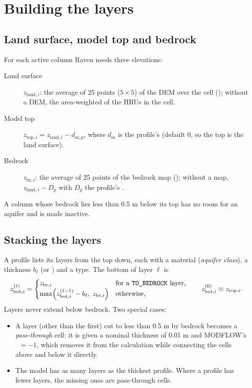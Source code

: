 \section{Building the layers}\label{ch:layers}
\subsection{Land surface, model top and bedrock}
For each active column Raven needs three elevations:
\begin{description}
\item[Land surface] $z_{\mathrm{land},i}$: the average of 25 points ($5\times5$) of the DEM over the cell
(); without a DEM, the area-weighted  of the HRUs in the cell.
\item[Model top] $z_{\mathrm{top},i}=z_{\mathrm{land},i}-d_{\mathrm{sz},p}$, where $d_{\mathrm{sz}}$ is the profile's
 (default 0, so the top is the land surface).
\item[Bedrock] $z_{\mathrm{br},i}$: the average of 25 points of the bedrock map (); without a map,
$z_{\mathrm{land},i}-D_p$ with $D_p$ the profile's .
\end{description}
A column whose bedrock lies less than 0.5 m below its top has no room for an aquifer and is made inactive.

\subsection{Stacking the layers}
A profile lists its layers from the top down, each with a material (\emph{aquifer class}), a thickness $b_\ell$ (or
) and a type. The bottom of layer $\ell$ is
\begin{equation}
z^{(\ell)}_{\mathrm{bot},i}=
\begin{cases}
z_{\mathrm{br},i} & \text{for a \cmd{TO\_BEDROCK} layer,}\\
\max\!\left(z^{(\ell-1)}_{\mathrm{bot},i}-b_\ell,\;z_{\mathrm{br},i}\right) & \text{otherwise,}
\end{cases}
\qquad z^{(0)}_{\mathrm{bot},i}\equiv z_{\mathrm{top},i}.
\end{equation}
Layers never extend below bedrock. Two special cases:
\begin{itemize}
\item A layer (other than the first) cut to less than 0.5 m by bedrock becomes a \emph{pass-through} cell: it is given
a nominal thickness of 0.01 m and MODFLOW's ~$=-1$, which removes it from the calculation while
connecting the cells above and below it directly.
\item The model has as many layers as the thickest profile. Where a profile has fewer layers, the missing ones are
pass-through cells.
\end{itemize}

